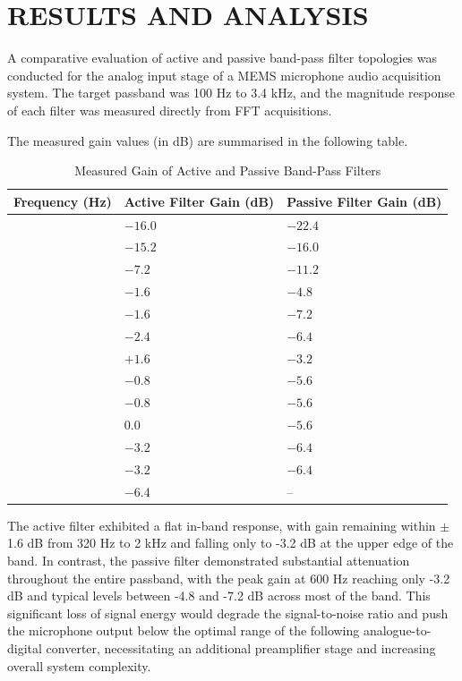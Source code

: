 \chapter{RESULTS AND ANALYSIS}

A comparative evaluation of active and passive band-pass filter topologies was conducted for the analog input stage of a MEMS microphone audio acquisition system. The target passband was 100 Hz to 3.4 kHz, and the magnitude response of each filter was measured directly from FFT acquisitions.

The measured gain values (in dB) are summarised in the following table.
\begin{table}[H]
\caption{Measured Gain of Active and Passive Band-Pass Filters}
\label{tab:gain_comparison}
\renewcommand{\arraystretch}{1.4}

\begin{tabularx}{\textwidth}
{|
>{\arraybackslash}Y|
>{\arraybackslash}Y|
>{\arraybackslash}Y|}
\hline
\textbf{Frequency (Hz)} & \textbf{Active Filter Gain (dB)} & \textbf{Passive Filter Gain (dB)} \\
   & $-16.0$ & $-22.4$ \\   & $-15.2$ & $-16.0$ \\   & $-7.2$  & $-11.2$ \\   & $-1.6$  & $-4.8$ \\   & $-1.6$  & $-7.2$ \\   & $-2.4$  & $-6.4$ \\   & $+1.6$  & $-3.2$ \\   & $-0.8$  & $-5.6$ \\  & $-0.8$  & $-5.6$ \\  & $0.0$   & $-5.6$ \\  & $-3.2$  & $-6.4$ \\  & $-3.2$  & $-6.4$ \\  & $-6.4$  & -- \\ \hline
\end{tabularx}
\end{table}
The active filter exhibited a flat in-band response, with gain remaining within $\pm$1.6 dB from 320 Hz to 2 kHz and falling only to -3.2 dB at the upper edge of the band. In contrast, the passive filter demonstrated substantial attenuation throughout the entire passband, with the peak gain at 600 Hz reaching only -3.2 dB and typical levels between -4.8 and -7.2 dB across most of the band. This significant loss of signal energy would degrade the signal-to-noise ratio and push the microphone output below the optimal range of the following analogue-to-digital converter, necessitating an additional preamplifier stage and increasing overall system complexity.

